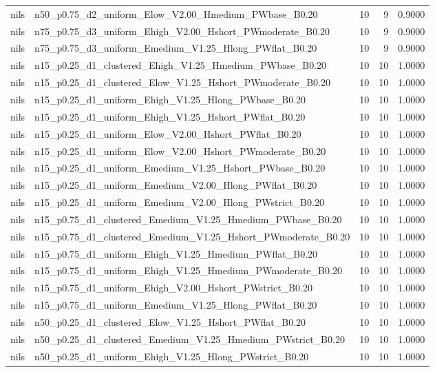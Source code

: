 \begin{tabular}{llrrr}
nils & n50_p0.75_d2_uniform_Elow_V2.00_Hmedium_PWbase_B0.20 & 10 & 9 & 0.9000 \\
nils & n75_p0.75_d3_uniform_Ehigh_V2.00_Hshort_PWmoderate_B0.20 & 10 & 9 & 0.9000 \\
nils & n75_p0.75_d3_uniform_Emedium_V1.25_Hlong_PWflat_B0.20 & 10 & 9 & 0.9000 \\
nils & n15_p0.25_d1_clustered_Ehigh_V1.25_Hmedium_PWbase_B0.20 & 10 & 10 & 1.0000 \\
nils & n15_p0.25_d1_clustered_Elow_V1.25_Hshort_PWmoderate_B0.20 & 10 & 10 & 1.0000 \\
nils & n15_p0.25_d1_uniform_Ehigh_V1.25_Hlong_PWbase_B0.20 & 10 & 10 & 1.0000 \\
nils & n15_p0.25_d1_uniform_Ehigh_V1.25_Hshort_PWflat_B0.20 & 10 & 10 & 1.0000 \\
nils & n15_p0.25_d1_uniform_Elow_V2.00_Hshort_PWflat_B0.20 & 10 & 10 & 1.0000 \\
nils & n15_p0.25_d1_uniform_Elow_V2.00_Hshort_PWmoderate_B0.20 & 10 & 10 & 1.0000 \\
nils & n15_p0.25_d1_uniform_Emedium_V1.25_Hshort_PWbase_B0.20 & 10 & 10 & 1.0000 \\
nils & n15_p0.25_d1_uniform_Emedium_V2.00_Hlong_PWflat_B0.20 & 10 & 10 & 1.0000 \\
nils & n15_p0.25_d1_uniform_Emedium_V2.00_Hlong_PWstrict_B0.20 & 10 & 10 & 1.0000 \\
nils & n15_p0.75_d1_clustered_Emedium_V1.25_Hmedium_PWbase_B0.20 & 10 & 10 & 1.0000 \\
nils & n15_p0.75_d1_clustered_Emedium_V1.25_Hshort_PWmoderate_B0.20 & 10 & 10 & 1.0000 \\
nils & n15_p0.75_d1_uniform_Ehigh_V1.25_Hmedium_PWflat_B0.20 & 10 & 10 & 1.0000 \\
nils & n15_p0.75_d1_uniform_Ehigh_V1.25_Hmedium_PWmoderate_B0.20 & 10 & 10 & 1.0000 \\
nils & n15_p0.75_d1_uniform_Ehigh_V2.00_Hshort_PWstrict_B0.20 & 10 & 10 & 1.0000 \\
nils & n15_p0.75_d1_uniform_Emedium_V1.25_Hlong_PWflat_B0.20 & 10 & 10 & 1.0000 \\
nils & n50_p0.25_d1_clustered_Elow_V1.25_Hshort_PWflat_B0.20 & 10 & 10 & 1.0000 \\
nils & n50_p0.25_d1_clustered_Emedium_V1.25_Hmedium_PWstrict_B0.20 & 10 & 10 & 1.0000 \\
nils & n50_p0.25_d1_uniform_Ehigh_V1.25_Hlong_PWstrict_B0.20 & 10 & 10 & 1.0000 \\

\end{tabular}

